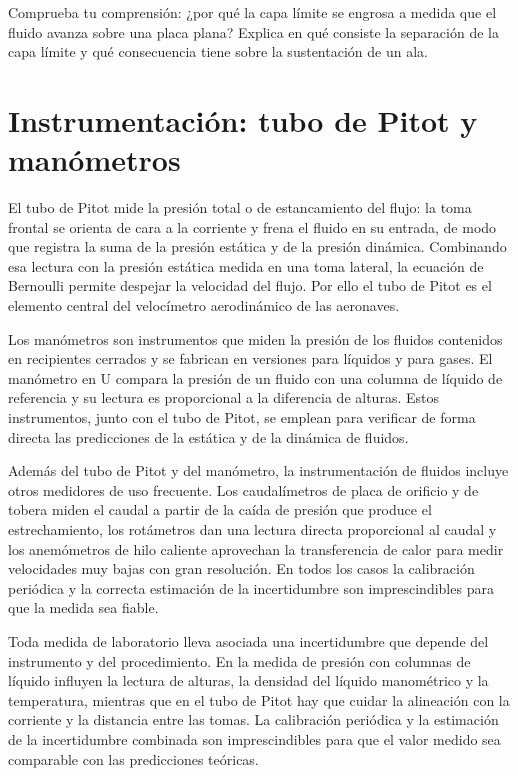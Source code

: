 \documentclass{book}
\begin{document}
\begin{tcolorbox}[title={Autoficha}, studiumcheck, breakable]

Comprueba tu comprensión: ¿por qué la capa límite se engrosa a medida que el fluido avanza sobre una placa plana? Explica en qué consiste la separación de la capa límite y qué consecuencia tiene sobre la sustentación de un ala.
\end{tcolorbox}

\chapter{Instrumentación: tubo de Pitot y manómetros}

El tubo de Pitot mide la presión total o de estancamiento del flujo: la toma frontal se orienta de cara a la corriente y frena el fluido en su entrada, de modo que registra la suma de la presión estática y de la presión dinámica. Combinando esa lectura con la presión estática medida en una toma lateral, la ecuación de Bernoulli permite despejar la velocidad del flujo. Por ello el tubo de Pitot es el elemento central del velocímetro aerodinámico de las aeronaves.

Los manómetros son instrumentos que miden la presión de los fluidos contenidos en recipientes cerrados y se fabrican en versiones para líquidos y para gases. El manómetro en U compara la presión de un fluido con una columna de líquido de referencia y su lectura es proporcional a la diferencia de alturas. Estos instrumentos, junto con el tubo de Pitot, se emplean para verificar de forma directa las predicciones de la estática y de la dinámica de fluidos.

Además del tubo de Pitot y del manómetro, la instrumentación de fluidos incluye otros medidores de uso frecuente. Los caudalímetros de placa de orificio y de tobera miden el caudal a partir de la caída de presión que produce el estrechamiento, los rotámetros dan una lectura directa proporcional al caudal y los anemómetros de hilo caliente aprovechan la transferencia de calor para medir velocidades muy bajas con gran resolución. En todos los casos la calibración periódica y la correcta estimación de la incertidumbre son imprescindibles para que la medida sea fiable.

Toda medida de laboratorio lleva asociada una incertidumbre que depende del instrumento y del procedimiento. En la medida de presión con columnas de líquido influyen la lectura de alturas, la densidad del líquido manométrico y la temperatura, mientras que en el tubo de Pitot hay que cuidar la alineación con la corriente y la distancia entre las tomas. La calibración periódica y la estimación de la incertidumbre combinada son imprescindibles para que el valor medido sea comparable con las predicciones teóricas.
\end{document}
